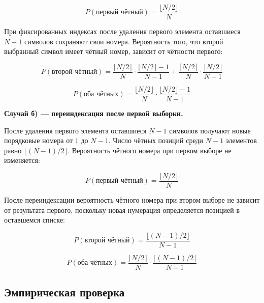 \documentclass[14pt,a4paper]{extarticle}
\begin{document}
\begin{equation}\label{eq.p_first_fixed}
P(\text{первый чётный}) = \frac{\lfloor N/2 \rfloor}{N}
\end{equation}

При фиксированных индексах после удаления первого элемента оставшиеся $N-1$ символов
сохраняют свои номера. Вероятность того, что второй выбранный символ имеет чётный номер,
зависит от чётности первого:


\begin{equation}\label{eq.p_second_fixed}
P(\text{второй чётный}) = \frac{\lfloor N/2 \rfloor}{N} \cdot \frac{\lfloor N/2 \rfloor - 1}{N-1} + \frac{\lceil N/2 \rceil}{N} \cdot \frac{\lfloor N/2 \rfloor}{N-1}
\end{equation}

\begin{equation}\label{eq.p_both_fixed}
P(\text{оба чётных}) = \frac{\lfloor N/2 \rfloor}{N} \cdot \frac{\lfloor N/2 \rfloor - 1}{N - 1}
\end{equation}

\textbf{Случай б) — переиндексация после первой выборки.}

После удаления первого элемента оставшиеся $N-1$ символов получают новые порядковые
номера от $1$ до $N-1$. Число чётных позиций среди $N-1$ элементов равно $\lfloor (N-1)/2 \rfloor$.
Вероятность чётного номера при первом выборе не изменяется:


\begin{equation}\label{eq.p_first_reindexed}
P(\text{первый чётный}) = \frac{\lfloor N/2 \rfloor}{N}
\end{equation}

После переиндексации вероятность чётного номера при втором выборе не зависит от результата
первого, поскольку новая нумерация определяется позицией в оставшемся списке:


\begin{equation}\label{eq.p_second_reindexed}
P(\text{второй чётный}) = \frac{\lfloor (N-1)/2 \rfloor}{N-1}
\end{equation}

\begin{equation}\label{eq.p_both_reindexed}
P(\text{оба чётных}) = \frac{\lfloor N/2 \rfloor}{N} \cdot \frac{\lfloor (N-1)/2 \rfloor}{N-1}
\end{equation}

\subsection{Эмпирическая проверка}
\end{document}
